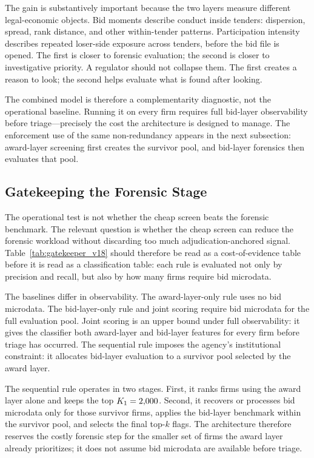The gain is substantively important because the two layers
measure different legal-economic objects. Bid moments describe
conduct inside tenders: dispersion, spread, rank distance, and
other within-tender patterns. Participation intensity describes
repeated loser-side exposure across tenders, before the bid
file is opened. The first is closer to forensic evaluation; the
second is closer to investigative priority. A regulator should
not collapse them. The first creates a reason to look; the
second helps evaluate what is found after looking.

The combined model is therefore a complementarity diagnostic,
not the operational baseline. Running it on every firm requires
full bid-layer observability before triage---precisely the cost
the architecture is designed to manage. The enforcement use of
the same non-redundancy appears in the next subsection:
award-layer screening first creates the survivor pool, and
bid-layer forensics then evaluates that pool.

\subsection{Gatekeeping the Forensic Stage}
\label{sec:sequential_gatekeeper}

The operational test is not whether the cheap screen beats the
forensic benchmark. The relevant question is whether the cheap
screen can reduce the forensic workload without discarding too
much adjudication-anchored signal.
Table~\ref{tab:gatekeeper_v18} should therefore be read as a
cost-of-evidence table before it is read as a classification
table: each rule is evaluated not only by precision and recall,
but also by how many firms require bid microdata.

The baselines differ in observability. The award-layer-only
rule uses no bid microdata. The bid-layer-only rule and joint
scoring require bid microdata for the full evaluation pool.
Joint scoring is an upper bound under full observability: it
gives the classifier both award-layer and bid-layer features
for every firm before triage has occurred. The sequential rule
imposes the agency's institutional constraint: it allocates
bid-layer evaluation to a survivor pool selected by the award
layer.

The sequential rule operates in two stages. First, it ranks
firms using the award layer alone and keeps the top
$K_1=2{,}000$. Second, it recovers or processes bid
microdata only for those survivor firms, applies the bid-layer
benchmark within the survivor pool, and selects the final
top-$k$ flags. The architecture therefore reserves the costly
forensic step for the smaller set of firms the award layer
already prioritizes; it does not assume bid microdata are
available before triage.


